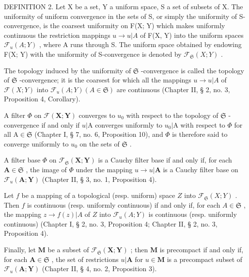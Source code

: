 DEFINITION 2. Let X be a set, Y a uniform space, S a set of subsets of X. The uniformity of uniform convergence in the sets of S, or simply the uniformity of S-convergence, is the coarsest uniformity on F(X; Y) which makes uniformly continuous the restriction mappings \(u \to u|A\) of F(X, Y) into the uniform spaces \(\mathcal{F}_u(A; Y)\) , where A runs through S. The uniform space obtained by endowing F(X; Y) with the uniformity of S-convergence is denoted by \(\mathcal{F}_{\mathfrak{S}}(X; Y)\) .

The topology induced by the uniformity of \(\mathfrak{S}\) -convergence is called the topology of \(\mathfrak{S}\) -convergence; it is the coarsest for which all the mappings \(u \to u|A\) of \(\mathcal{F}(X; Y)\) into \(\mathcal{F}_u(A; Y) (A \in \mathfrak{S})\) are continuous (Chapter II, § 2, no. 3, Proposition 4, Corollary).

A filter \(\Phi\) on \(\mathcal{F}(\mathbf{X};\mathbf{Y})\) converges to \(u_{0}\) with respect to the topology of \(\mathfrak{S}\) -convergence if and only if \(u|\mathrm{A}\) converges uniformly to \(u_{0}|\mathrm{A}\) with respect to \(\Phi\) for all \(\mathrm{A}\in \mathfrak{S}\) (Chapter I, § 7, no. 6, Proposition 10), and \(\Phi\) is therefore said to converge uniformly to \(u_{0}\) on the sets of \(\mathfrak{S}\) .

A filter base \(\Phi\) on \(\mathcal{F}_{\mathfrak{S}}(\mathbf{X};\mathbf{Y})\) is a Cauchy filter base if and only if, for each \(\mathbf{A}\in\mathfrak{S}\) , the image of \(\Phi\) under the mapping \(u\to u|\mathbf{A}\) is a Cauchy filter base on \(\mathcal{F}_{u}(\mathbf{A};\mathbf{Y})\) (Chapter II, § 3, no. 1, Proposition 4).

Let \(f\) be a mapping of a topological (resp. uniform) space \(Z\) into \(\mathcal{F}_{\mathfrak{S}}(X; Y)\) . Then \(f\) is continuous (resp. uniformly continuous) if and only if, for each \(A \in \mathfrak{S}\) , the mapping \(z \to f(z)|A\) of \(Z\) into \(\mathcal{F}_u(A; Y)\) is continuous (resp. uniformly continuous) (Chapter I, § 2, no. 3, Proposition 4; Chapter II, § 2, no. 3, Proposition 4).

Finally, let \(\mathbf{M}\) be a subset of \(\mathcal{F}_{\mathfrak{S}}(\mathbf{X};\mathbf{Y})\) ; then \(\mathbf{M}\) is precompact if and only if, for each \(\mathbf{A} \in \mathfrak{S}\) , the set of restrictions \(u|\mathbf{A}\) for \(u \in \mathbf{M}\) is a precompact subset of \(\mathcal{F}_u(\mathbf{A};\mathbf{Y})\) (Chapter II, § 4, no. 2, Proposition 3).

